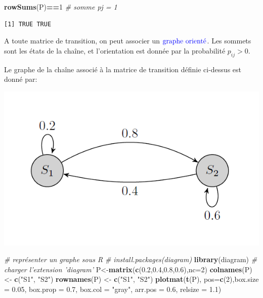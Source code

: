 \documentclass[
]{book}
\newenvironment{Shaded}{\begin{snugshade}}{\end{snugshade}}
\newcommand{\CommentTok}[1]{\textcolor[rgb]{0.56,0.35,0.01}{\textit{#1}}}
\newcommand{\DataTypeTok}[1]{\textcolor[rgb]{0.13,0.29,0.53}{#1}}
\newcommand{\DecValTok}[1]{\textcolor[rgb]{0.00,0.00,0.81}{#1}}
\newcommand{\FloatTok}[1]{\textcolor[rgb]{0.00,0.00,0.81}{#1}}
\newcommand{\KeywordTok}[1]{\textcolor[rgb]{0.13,0.29,0.53}{\textbf{#1}}}
\newcommand{\NormalTok}[1]{#1}
\newcommand{\OperatorTok}[1]{\textcolor[rgb]{0.81,0.36,0.00}{\textbf{#1}}}
\newcommand{\StringTok}[1]{\textcolor[rgb]{0.31,0.60,0.02}{#1}}
\theoremstyle{definition}
\theoremstyle{definition}
\theoremstyle{definition}
\theoremstyle{remark}
\begin{document}
\begin{Shaded}
\begin{Highlighting}[]
\KeywordTok{rowSums}\NormalTok{(P)}\OperatorTok{==}\DecValTok{1} \CommentTok{# somme pj = 1}
\end{Highlighting}
\end{Shaded}

\begin{verbatim}
[1] TRUE TRUE
\end{verbatim}

A toute matrice de transition, on peut associer un \(\color{blue}{\mathbf{\text{graphe orienté}}}\). Les sommets sont les états de la chaîne, et l'orientation est donnée par la probabilité \(p_{ij}>0\).

Le graphe de la chaîne associé à la matrice de transition définie ci-dessus est donné par:

\begin{center}\includegraphics[width=8.36in]{images/graph1} \end{center}

\begin{Shaded}
\begin{Highlighting}[]
\CommentTok{# représenter un graphe sous R}
\CommentTok{# install.packages(diagram)}
\KeywordTok{library}\NormalTok{(diagram) }\CommentTok{# charger l'extension 'diagram'}
\NormalTok{P<-}\KeywordTok{matrix}\NormalTok{(}\KeywordTok{c}\NormalTok{(}\FloatTok{0.2}\NormalTok{,}\FloatTok{0.4}\NormalTok{,}\FloatTok{0.8}\NormalTok{,}\FloatTok{0.6}\NormalTok{),}\DataTypeTok{nc=}\DecValTok{2}\NormalTok{)}
\KeywordTok{colnames}\NormalTok{(P) <-}\StringTok{ }\KeywordTok{c}\NormalTok{(}\StringTok{"S1"}\NormalTok{, }\StringTok{"S2"}\NormalTok{)}
\KeywordTok{rownames}\NormalTok{(P) <-}\StringTok{ }\KeywordTok{c}\NormalTok{(}\StringTok{"S1"}\NormalTok{, }\StringTok{"S2"}\NormalTok{)}
\KeywordTok{plotmat}\NormalTok{(}\KeywordTok{t}\NormalTok{(P), }\DataTypeTok{pos=}\KeywordTok{c}\NormalTok{(}\DecValTok{2}\NormalTok{),}\DataTypeTok{box.size =} \FloatTok{0.05}\NormalTok{, }\DataTypeTok{box.prop =} \FloatTok{0.7}\NormalTok{, }
      \DataTypeTok{box.col =} \StringTok{"gray"}\NormalTok{, }\DataTypeTok{arr.pos =} \FloatTok{0.6}\NormalTok{, }\DataTypeTok{relsize =} \FloatTok{1.1}\NormalTok{)}
\end{Highlighting}
\end{Shaded}
\end{document}
